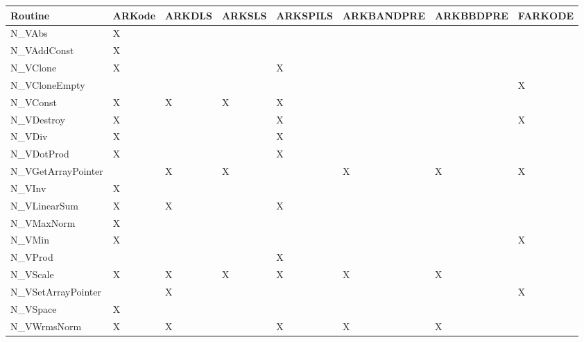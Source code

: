 \documentclass[letterpaper,10pt,english]{sphinxmanual}
\begin{document}
\begin{tabulary}{\linewidth}{|L|L|L|L|L|L|L|L|}
\hline
\textbf{
Routine
} & \textbf{
ARKode
} & \textbf{
ARKDLS
} & \textbf{
ARKSLS
} & \textbf{
ARKSPILS
} & \textbf{
ARKBANDPRE
} & \textbf{
ARKBBDPRE
} & \textbf{
FARKODE
}\\\hline

N\_VAbs
 & 
X
 &  &  &  &  &  & \\\hline

N\_VAddConst
 & 
X
 &  &  &  &  &  & \\\hline

N\_VClone
 & 
X
 &  &  & 
X
 &  &  & \\\hline

N\_VCloneEmpty
 &  &  &  &  &  &  & 
X
\\\hline

N\_VConst
 & 
X
 & 
X
 & 
X
 & 
X
 &  &  & \\\hline

N\_VDestroy
 & 
X
 &  &  & 
X
 &  &  & 
X
\\\hline

N\_VDiv
 & 
X
 &  &  & 
X
 &  &  & \\\hline

N\_VDotProd
 & 
X
 &  &  & 
X
 &  &  & \\\hline

N\_VGetArrayPointer
 &  & 
X
 & 
X
 &  & 
X
 & 
X
 & 
X
\\\hline

N\_VInv
 & 
X
 &  &  &  &  &  & \\\hline

N\_VLinearSum
 & 
X
 & 
X
 &  & 
X
 &  &  & \\\hline

N\_VMaxNorm
 & 
X
 &  &  &  &  &  & \\\hline

N\_VMin
 & 
X
 &  &  &  &  &  & 
X
\\\hline

N\_VProd
 &  &  &  & 
X
 &  &  & \\\hline

N\_VScale
 & 
X
 & 
X
 & 
X
 & 
X
 & 
X
 & 
X
 & \\\hline

N\_VSetArrayPointer
 &  & 
X
 &  &  &  &  & 
X
\\\hline

N\_VSpace
 & 
X
 &  &  &  &  &  & \\\hline

N\_VWrmsNorm
 & 
X
 & 
X
 &  & 
X
 & 
X
 & 
X
 & \\\hline
\end{tabulary}
\end{document}
